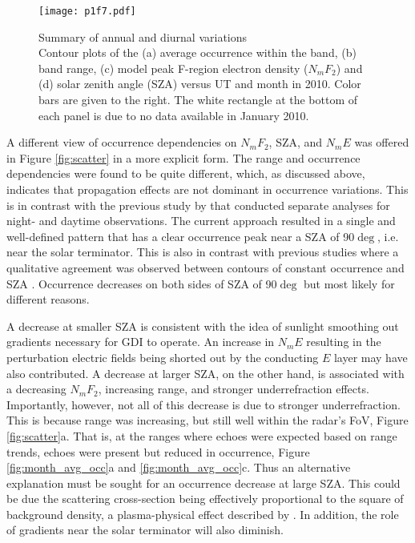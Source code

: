 \begin{figure}
	\centering
	\texttt{[image: p1f7.pdf]}
	\caption[Summary of annual and diurnal variations]{{\:}Summary of annual and diurnal variations\\ Contour plots of the (a) average occurrence within the band, (b) band range, (c) model peak F-region electron density (\(N_mF_2\)) and (d) solar zenith angle (SZA) versus UT and month in 2010. Color bars are given to the right. The white rectangle at the bottom of each panel is due to no data available in January 2010.}
	\label{fig:month_ut}
\end{figure}

A different view of occurrence dependencies on \(N_mF_2\), SZA, and \(N_mE\) was offered in Figure \ref{fig:scatter} in a more explicit form. The range and occurrence dependencies were found to be quite different, which, as discussed above, indicates that propagation effects are not dominant in occurrence variations. This is in contrast with the previous study by \citet{Kane2012} that conducted separate analyses for night- and daytime observations. The current approach resulted in a single and well-defined pattern that has a clear occurrence peak near a SZA of 90\(\deg\), i.e. near the solar terminator. This is also in contrast with previous studies where a qualitative agreement was observed between contours of constant occurrence and SZA \citep{Kane2012,Ghezelbash2014b}. Occurrence decreases on both sides of SZA of 90\(\deg\) but most likely for different reasons.

A decrease at smaller SZA is consistent with the idea of sunlight smoothing out gradients necessary for GDI to operate. An increase in \(N_mE\) resulting in the perturbation electric fields being shorted out by the conducting \(E\) layer may have also contributed. A decrease at larger SZA, on the other hand, is associated with a decreasing \(N_mF_2\), increasing range, and stronger underrefraction effects. Importantly, however, not all of this decrease is due to stronger underrefraction. This is because range was increasing, but still well within the radar's FoV, Figure \ref{fig:scatter}a. That is, at the ranges where echoes were expected based on range trends, echoes were present but reduced in occurrence, Figure \ref{fig:month_avg_occ}a and \ref{fig:month_avg_occ}c. Thus an alternative explanation must be sought for an occurrence decrease at large SZA. This could be due the scattering cross-section being effectively proportional to the square of background density, a plasma-physical effect described by \citet{Makarevich2014b}. In addition, the role of gradients near the solar terminator will also diminish.

